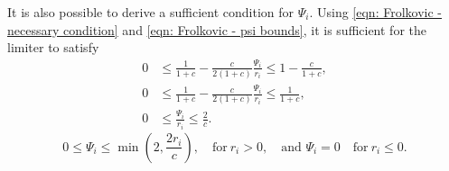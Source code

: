 \documentclass[../thesis.tex]{subfiles}
\begin{document}
\begin{remark}
It is also possible to derive a sufficient condition for \(\Psi_{i}\). Using \eqref{eqn: Frolkovic - necessary condition} and \eqref{eqn: Frolkovic - psi bounds}, it is sufficient for the limiter to satisfy
\begin{equation}
    \begin{split}
        0
        &\leq
        \frac{1}{1+c}
        -\frac{c}{2(1+c)}
        \frac{\Psi_{i}}{r_{i}}
        \leq
        1 - \frac{c}{1+c},
        \\
        0
        &\leq
        \frac{1}{1+c}
        -\frac{c}{2(1+c)}
        \frac{\Psi_{i}}{r_{i}}
        \leq
        \frac{1}{1+c},
        \\
        0
        &\leq
        \frac{\Psi_{i}}{r_{i}}
        \leq
        \frac{2}{c}.
    \end{split}
\end{equation}
\begin{equation}
    0
    \leq
    \Psi_{i}
    \leq
    \min\left( 2, \frac{2r_{i}}{c} \right),
    \quad
    \text{for}\ r_{i} > 0,
    \quad
    \text{and } \Psi_{i} = 0
    \quad
    \text{for}\ r_{i} \leq 0.
\end{equation}
\end{remark}
\end{document}

